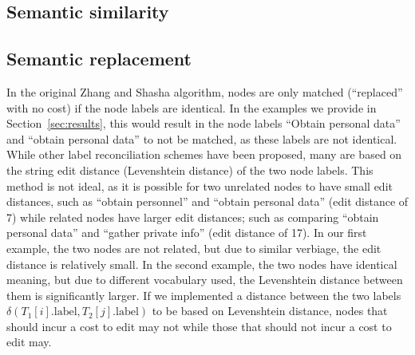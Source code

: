 



\subsection{Semantic similarity}








\subsection{Semantic replacement}

In the original Zhang and Shasha algorithm, nodes are only matched (``replaced'' with no cost) if the node labels are identical. In the examples we provide in Section~\ref{sec:results}, this would result in the node labels ``Obtain personal data'' and ``obtain personal data'' to not be matched, as these labels are not identical. While other label reconciliation schemes have been proposed, many are based on the string edit distance (Levenshtein distance) of the two node labels. This method is not ideal, as it is possible for two unrelated nodes to have small edit distances, such as ``obtain personnel'' and ``obtain personal data'' (edit distance of 7) while related nodes have larger edit distances; such as comparing ``obtain personal data'' and ``gather private info'' (edit distance of 17). In our first example, the two nodes are not related, but due to similar verbiage, the edit distance is relatively small. In the second example, the two nodes have identical meaning, but due to different vocabulary used, the Levenshtein distance between them is significantly larger. If we implemented a distance between the two labels  $\delta\left(T_1[i].\text{label}, T_2[j].\text{label}\right)$ to be based on Levenshtein distance, nodes that should incur a cost to edit may not while those that should not incur a cost to edit may. 

